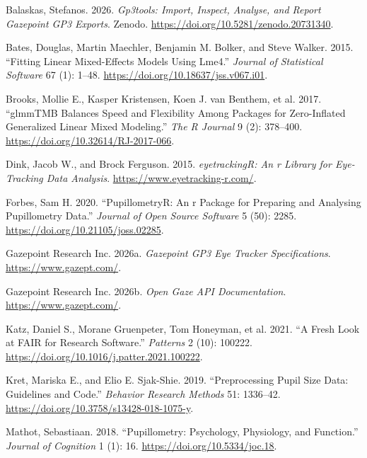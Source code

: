 \documentclass[
]{article}
\newlength{\cslhangindent}
\newenvironment{CSLReferences}[2] %
 {\begin{list}{}{%
  \setlength{\itemindent}{0pt}
  \setlength{\leftmargin}{0pt}
  \setlength{\parsep}{0pt}
  \ifodd #1
   \setlength{\leftmargin}{\cslhangindent}
   \setlength{\itemindent}{-1\cslhangindent}
  \fi
  \setlength{\itemsep}{#2\baselineskip}}}
 {\end{list}}
\begin{document}
\protect{}\label{refs}
\begin{CSLReferences}{1}{1}
Balaskas, Stefanos. 2026. \emph{Gp3tools: Import, Inspect, Analyse, and
Report Gazepoint GP3 Exports}. Zenodo.
\url{https://doi.org/10.5281/zenodo.20731340}.

Bates, Douglas, Martin Maechler, Benjamin M. Bolker, and Steve Walker.
2015. {``Fitting Linear Mixed-Effects Models Using Lme4.''}
\emph{Journal of Statistical Software} 67 (1): 1--48.
\url{https://doi.org/10.18637/jss.v067.i01}.

Brooks, Mollie E., Kasper Kristensen, Koen J. van Benthem, et al. 2017.
{``glmmTMB Balances Speed and Flexibility Among Packages for
Zero-Inflated Generalized Linear Mixed Modeling.''} \emph{The R Journal}
9 (2): 378--400. \url{https://doi.org/10.32614/RJ-2017-066}.

Dink, Jacob W., and Brock Ferguson. 2015. \emph{eyetrackingR: An r
Library for Eye-Tracking Data Analysis}.
\url{https://www.eyetracking-r.com/}.

Forbes, Sam H. 2020. {``PupillometryR: An r Package for Preparing and
Analysing Pupillometry Data.''} \emph{Journal of Open Source Software} 5
(50): 2285. \url{https://doi.org/10.21105/joss.02285}.

Gazepoint Research Inc. 2026a. \emph{Gazepoint GP3 Eye Tracker
Specifications}. \url{https://www.gazept.com/}.

Gazepoint Research Inc. 2026b. \emph{Open Gaze API Documentation}.
\url{https://www.gazept.com/}.

Katz, Daniel S., Morane Gruenpeter, Tom Honeyman, et al. 2021. {``A
Fresh Look at FAIR for Research Software.''} \emph{Patterns} 2 (10):
100222. \url{https://doi.org/10.1016/j.patter.2021.100222}.

Kret, Mariska E., and Elio E. Sjak-Shie. 2019. {``Preprocessing Pupil
Size Data: Guidelines and Code.''} \emph{Behavior Research Methods} 51:
1336--42. \url{https://doi.org/10.3758/s13428-018-1075-y}.

Mathot, Sebastiaan. 2018. {``Pupillometry: Psychology, Physiology, and
Function.''} \emph{Journal of Cognition} 1 (1): 16.
\url{https://doi.org/10.5334/joc.18}.


\end{CSLReferences}
\end{document}
